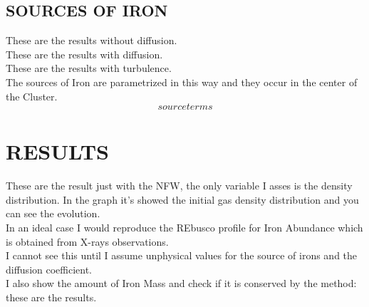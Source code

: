 \documentclass{article}
\numberwithin{equation}{subsection}
\begin{document}
\subsection{SOURCES OF IRON} \label{sec:ceph}
\vspace{0.2 cm}
These are the results without diffusion.\\
These are the results with diffusion.\\
These are the results with turbulence.\\
The sources of Iron are parametrized in this way
and they occur in the center of the Cluster.
\begin{equation}
    source terms
\end{equation}

\section{RESULTS}
These are the result just with the NFW, the only variable
I asses is the density distribution. In the graph 
it's showed the initial gas density distribution and you can see
the evolution.\\
In an ideal case I would reproduce the REbusco profile
for Iron Abundance which is obtained from 
X-rays observations.\\
I cannot see this until I assume unphysical values
for the source of irons and the diffusion coefficient.\\
I also show the amount of Iron Mass and check if 
it is conserved by the method: these are the results.\\
\end{document}
